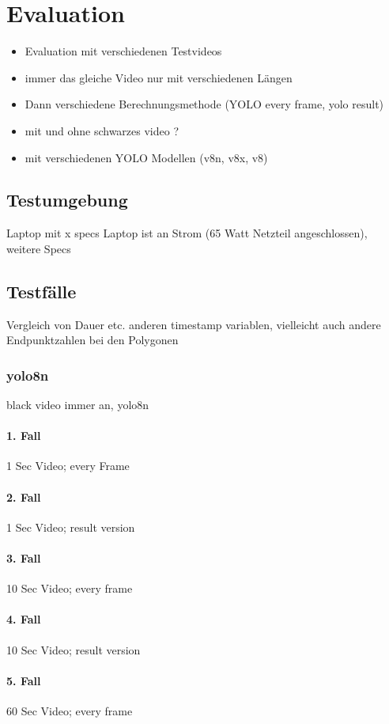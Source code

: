 \chapter{Evaluation}
\label{ch:Evaluation}

{
	\begin{itemize}
		\item Evaluation mit verschiedenen Testvideos
		\item immer das gleiche Video nur mit verschiedenen Längen
		\item Dann verschiedene Berechnungsmethode (YOLO every frame, yolo result)
		\item mit und ohne schwarzes video ?
		\item mit verschiedenen YOLO Modellen (v8n, v8x, v8)
	\end{itemize}

}
\section{Testumgebung}{
	Laptop mit x specs
	Laptop ist an Strom (65 Watt Netzteil angeschlossen), weitere Specs
}
\section{Testfälle}
{Vergleich von Dauer etc. anderen timestamp variablen, vielleicht auch andere Endpunktzahlen bei den Polygonen}
\subsection{yolo8n}
{black video immer an, yolo8n}
\subsubsection{1. Fall} {1 Sec Video; every Frame}
\subsubsection{2. Fall} {1 Sec Video; result version}
\subsubsection{3. Fall} {10 Sec Video; every frame}
\subsubsection{4. Fall} {10 Sec Video; result version}
\subsubsection{5. Fall} {60 Sec Video; every frame}
